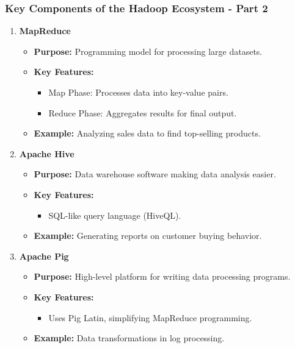 \documentclass[aspectratio=169]{beamer}
\begin{document}
\begin{frame}[fragile]
    \frametitle{Key Components of the Hadoop Ecosystem - Part 2}
    \begin{enumerate}[resume]
        \item \textbf{MapReduce}
        \begin{itemize}
            \item \textbf{Purpose:} Programming model for processing large datasets.
            \item \textbf{Key Features:}
            \begin{itemize}
                \item Map Phase: Processes data into key-value pairs.
                \item Reduce Phase: Aggregates results for final output.
            \end{itemize}
            \item \textbf{Example:} Analyzing sales data to find top-selling products.
        \end{itemize}

        \item \textbf{Apache Hive}
        \begin{itemize}
            \item \textbf{Purpose:} Data warehouse software making data analysis easier.
            \item \textbf{Key Features:}
            \begin{itemize}
                \item SQL-like query language (HiveQL).
            \end{itemize}
            \item \textbf{Example:} Generating reports on customer buying behavior.
        \end{itemize}

        \item \textbf{Apache Pig}
        \begin{itemize}
            \item \textbf{Purpose:} High-level platform for writing data processing programs.
            \item \textbf{Key Features:}
            \begin{itemize}
                \item Uses Pig Latin, simplifying MapReduce programming.
            \end{itemize}
            \item \textbf{Example:} Data transformations in log processing.
        \end{itemize}
    \end{enumerate}
\end{frame}
\end{document}

